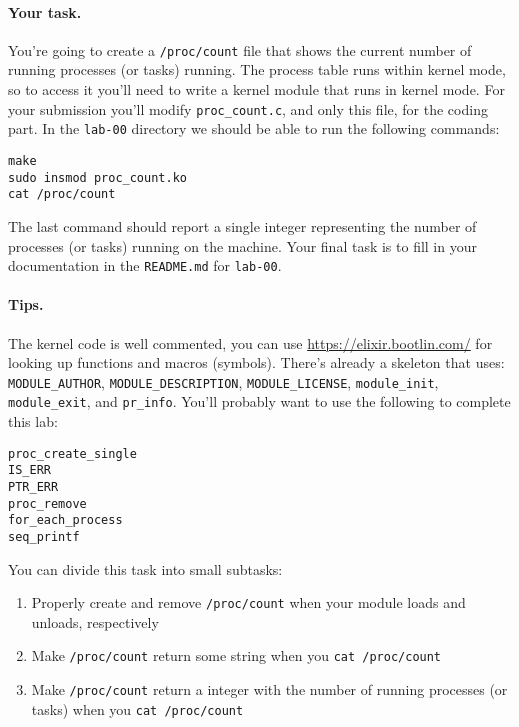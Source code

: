\paragraph{Your task.}

You're going to create a \lstinline|/proc/count| file that shows the current
number of running processes (or tasks) running.
The process table runs within kernel mode, so to access it you'll need to write
a kernel module that runs in kernel mode.
For your submission you'll modify \lstinline|proc_count.c|, and only this file,
for the coding part.
In the \lstinline|lab-00| directory we should be able to run the following
commands:

\begin{lstlisting}[xleftmargin=2em]
make
sudo insmod proc_count.ko
cat /proc/count 
\end{lstlisting}

\noindent
The last command should report a single integer representing the number of
processes (or tasks) running on the machine.
Your final task is to fill in your documentation in the \lstinline|README.md|
for \lstinline|lab-00|.

\paragraph{Tips.}

The kernel code is well commented, you can use \url{https://elixir.bootlin.com/}
for looking up functions and macros (symbols). There's already a skeleton that
uses: \lstinline|MODULE_AUTHOR|, \lstinline|MODULE_DESCRIPTION|,
\lstinline|MODULE_LICENSE|, \lstinline|module_init|, \lstinline|module_exit|,
and \lstinline|pr_info|.
You'll probably want to use the following to complete this lab:

\begin{lstlisting}[xleftmargin=2em]
proc_create_single
IS_ERR
PTR_ERR
proc_remove
for_each_process
seq_printf
\end{lstlisting}

\noindent
You can divide this task into small subtasks:

\begin{enumerate}
  \item Properly create and remove \lstinline|/proc/count| when your module
        loads and unloads, respectively
  \item Make \lstinline|/proc/count| return some string when you
        \lstinline|cat /proc/count|
  \item Make \lstinline|/proc/count| return a integer with the number of running
        processes (or tasks) when you \lstinline|cat /proc/count|
\end{enumerate}

